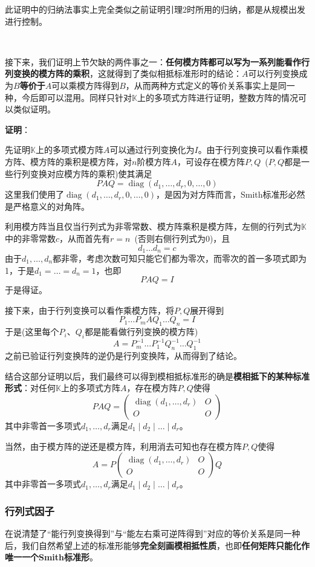 \documentclass[a4paper,UTF8,fontset=windows,AutoFakeBold]{ctexart}
\DeclareMathOperator{\diag}{diag}
\newcommand*{\note}{\noindent *}
\newcommand{\proo}[1]{{\vspace{5pt}\kaishu\noindent\textbf{证明}：\vspace{-3pt}
\begin{compactitem}
    \item[] #1
\end{compactitem}
}}
\begin{document}
\note 此证明中的归纳法事实上完全类似之前证明引理2时所用的归纳，都是从规模出发进行控制。

\

接下来，我们证明上节欠缺的两件事之一：\textbf{任何模方阵都可以写为一系列能看作行列变换的模方阵的乘积}，这就得到了类似相抵标准形时的结论：$A$可以行列变换成为$B$\textbf{等价于}$A$可以乘模方阵得到$B$，从而两种方式定义的等价关系事实上是同一种，今后即可以混用。同样只针对$\mathbb{K}$上的多项式方阵进行证明，整数方阵的情况可以类似证明。

\proo{
    先证明$\mathbb{K}$上的多项式模方阵$A$可以通过行列变换化为$I$。由于行列变换可以看作乘模方阵、模方阵的乘积是模方阵，对$n$阶模方阵$A$，可设存在模方阵$P,Q$\ ($P,Q$都是一些行列变换对应模方阵的乘积)使其满足
    $$PAQ=\diag(d_1,\dots,d_r,0,\dots,0)$$
    这里我们使用了$\diag(d_1,\dots,d_r,0,\dots,0)$，是因为对方阵而言，Smith标准形必然是严格意义的对角阵。

    利用模方阵当且仅当行列式为非零常数、模方阵乘积是模方阵，左侧的行列式为$\mathbb{K}$中的非零常数$c$，从而首先有$r=n$\ (否则右侧行列式为0)，且
    $$d_1\dots d_n=c$$
    由于$d_1,\dots,d_n$都非零，考虑次数可知只能它们都为零次，而零次的首一多项式即为1，于是$d_1=\dots=d_n=1$，也即
    $$PAQ=I$$
    于是得证。

    接下来，由于行列变换可以看作乘模方阵，将$P,Q$展开得到
    $$P_1\dots P_mAQ_1\dots Q_n=I$$
    于是(这里每个$P_i$、$Q_i$都是能看做行列变换的模方阵)
    $$A=P_m^{-1}\dots P_1^{-1}Q_n^{-1}\dots Q_1^{-1}$$
    之前已验证行列变换阵的逆仍是行列变换阵，从而得到了结论。
}

结合这部分证明以后，我们最终可以得到模相抵标准形的确是\textbf{模相抵下的某种标准形式}：对任何$\mathbb{K}$上的多项式方阵$A$，存在模方阵$P,Q$使得
$$PAQ=\begin{pmatrix}\diag(d_1,\dots,d_r)&O\\O&O\end{pmatrix}$$
其中非零首一多项式$d_1,\dots,d_r$满足$d_1\mid d_2\mid\dots\mid d_r$。

当然，由于模方阵的逆还是模方阵，利用消去可知也存在模方阵$P,Q$使得
$$A=P\begin{pmatrix}\diag(d_1,\dots,d_r)&O\\O&O\end{pmatrix}Q$$
其中非零首一多项式$d_1,\dots,d_r$满足$d_1\mid d_2\mid\dots\mid d_r$。

\subsubsection{行列式因子}
在说清楚了``能行列变换得到''与``能左右乘可逆阵得到''对应的等价关系是同一种后，我们自然希望上述的标准形能够\textbf{完全刻画模相抵性质}，也即\textbf{任何矩阵只能化作唯一一个Smith标准形}。
\end{document}
